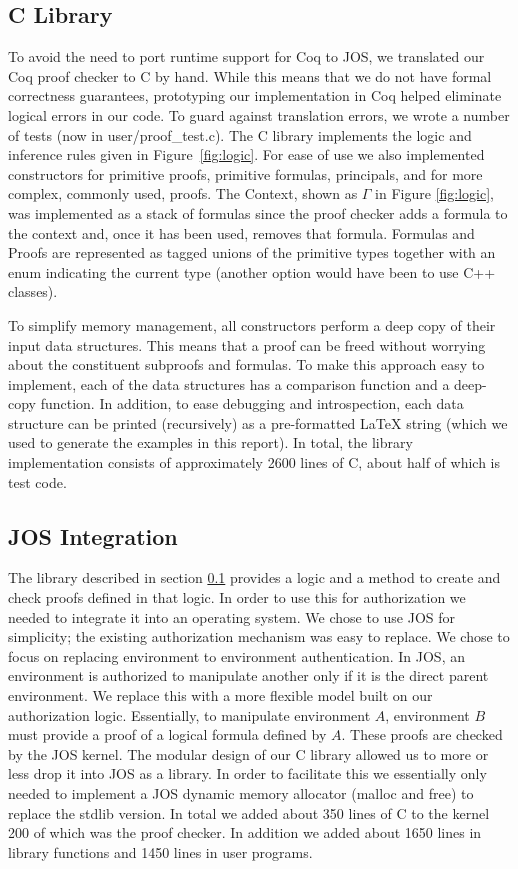 \documentclass[10pt]{article}
\begin{document}
\subsection{C Library} \label{sec:clib}
To avoid the need to port runtime support for Coq to JOS, we translated our Coq proof checker to C by hand.
While this means that we do not have formal correctness guarantees, prototyping our implementation in Coq helped eliminate logical errors in our code. To guard against translation errors, we wrote a number of tests (now in \textsf{user/proof\_test.c}).  The C library implements the logic and inference rules given in Figure~\ref{fig:logic}.  For ease of use we also implemented constructors for primitive proofs, primitive formulas, principals, and for more complex, commonly used, proofs.  The Context, shown as $\Gamma$ in Figure \ref{fig:logic}, was implemented as a stack of formulas since the proof checker adds a formula to the context and, once it has been used, removes that formula.  Formulas and Proofs are represented as tagged \textsf{union}s of the primitive types together with an \textsf{enum} indicating the current type (another option would have been to use C++ classes).  

To simplify memory management, all constructors perform a deep copy of their input data structures. This means that a proof can be freed without worrying about the constituent subproofs and formulas.  To make this approach easy to implement, each of the data structures has a comparison function and a deep-copy function.  In addition, to ease debugging and introspection, each data structure can be printed (recursively) as a pre-formatted \LaTeX{ } string (which we used to generate the examples in this report).  In total, the library implementation consists of approximately 2600 lines of C, about half of which is test code.

\subsection{JOS Integration}\label{sec:jos}
The library described in section \ref{sec:clib} provides a logic and a method to create and check proofs defined in that logic.  In order to use this for authorization we needed to integrate it into an operating system.  We chose to use JOS for simplicity; the existing authorization mechanism was easy to replace.  We chose to focus on replacing environment to environment authentication.  In JOS, an environment is authorized to manipulate another only if it is the direct parent environment. We replace this with a more flexible model built on our authorization logic.  Essentially, to manipulate environment $A$, environment $B$ must provide a proof of a logical formula defined by $A$.  These proofs are checked by the JOS kernel. The modular design of our C library allowed us to more or less drop it into JOS as a library.  In order to facilitate this we essentially only needed to implement a JOS dynamic memory allocator (\textsf{malloc} and \textsf{free}) to replace the \textsf{stdlib} version.   In total we added about 350 lines of C to the kernel 200 of which was the proof checker.  In addition we added about 1650 lines in library functions and 1450 lines in user programs.
\end{document}
